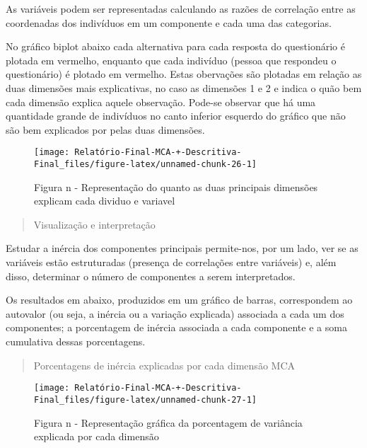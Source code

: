\documentclass[
]{article}
\begin{document}
As variáveis podem ser representadas calculando as razões de correlação
entre as coordenadas dos indivíduos em um componente e cada uma das
categorias.

No gráfico biplot abaixo cada alternativa para cada resposta do
questionário é plotada em vermelho, enquanto que cada indivíduo (pessoa
que respondeu o questionário) é plotado em vermelho. Estas obervações
são plotadas em relação as duas dimensões mais explicativas, no caso as
dimensões 1 e 2 e indica o quão bem cada dimensão explica aquele
observação. Pode-se observar que há uma quantidade grande de indivíduos
no canto inferior esquerdo do gráfico que não são bem explicados por
pelas duas dimensões.

\begin{figure}

{\centering \texttt{[image: Relatório-Final-MCA-+-Descritiva-Final\_files/figure-latex/unnamed-chunk-26-1]} 

}

\caption{Figura n - Representação do quanto as duas principais dimensões explicam cada dividuo e variavel}\label{fig:unnamed-chunk-26}
\end{figure}

\begin{quote}
Visualização e interpretação
\end{quote}

Estudar a inércia dos componentes principais permite-nos, por um lado,
ver se as variáveis estão estruturadas (presença de correlações entre
variáveis) e, além disso, determinar o número de componentes a serem
interpretados.

Os resultados em abaixo, produzidos em um gráfico de barras,
correspondem ao autovalor (ou seja, a inércia ou a variação explicada)
associada a cada um dos componentes; a porcentagem de inércia associada
a cada componente e a soma cumulativa dessas porcentagens.

\begin{quote}
Porcentagens de inércia explicadas por cada dimensão MCA
\end{quote}

\begin{figure}

{\centering \texttt{[image: Relatório-Final-MCA-+-Descritiva-Final\_files/figure-latex/unnamed-chunk-27-1]} 

}

\caption{Figura n - Representação gráfica da porcentagem de variância explicada por cada dimensão}\label{fig:unnamed-chunk-27}
\end{figure}
\end{document}
